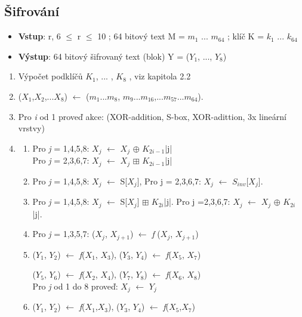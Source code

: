 \documentclass[12pt,a4paper]{article}
\begin{document}
{\subsection{Šifrování}}

\begin{itemize}  
\item \textbf{Vstup}: r, 6 $\leq$ r $\leq$ 10 ; 64 bitový text M = $m_{1}$ ... $m_{64}$ ; klíč K = $k_{1}$ ... $k_{64}$
\item \textbf{Výstup}: 64 bitový šifrovaný text (blok) Y = ($Y_{1}$, ..., $Y_{8}$) 
\end{itemize}

\begin{enumerate}
\item Výpočet podklíčů $K_{1}$, ... , $K_{8}$ , viz kapitola 2.2 
\item ($X_{1}$,$X_{2}$,...$X_{8}$) 
$\leftarrow$
($m_{1}$...$m_{8}$, $m_{9}$...$m_{16}$,...$m_{57}$...$m_{64}$).
\item Pro \emph{i} od 1 proveď akce: (XOR-addition, S-box, XOR-adittion, 3x lineární vrstvy)
\item

\begin{enumerate}
\item Pro \emph{j} = 1,4,5,8: $X_{j}$ $\leftarrow$ $X_{j}$ $\oplus$ $K_{2i-1}$|j|\\
Pro \emph{j} = 2,3,6,7: $X_{j}$ $\leftarrow$ $X_{j}$ $\boxplus$ $K_{2i-1}$|j|
\item Pro \emph{j} = 1,4,5,8: $X_{j}$ $\leftarrow$ S[$X_{j}$], Pro j = 2,3,6,7: $X_{j}$ $\leftarrow$ $S_{inv}$[$X_{j}$].

\item Pro \emph{j} = 1,4,5,8: $X_{j}$ $\leftarrow$ S[$X_{j}$] $\boxplus$ $K_{2i}$|j|. Pro j =2,3,6,7: $X_{j}$ $\leftarrow$ $X_{j}$ $\oplus$ $K_{2i}$|j|.

\item Pro \emph{j} = 1,3,5,7: ($X_{j}$, $X_{j+1}$) $\leftarrow$ \emph{f} ($X_{j}$, $X_{j+1}$)

\item ($Y_{1}$, $Y_{2}$) $\leftarrow$ \emph{f}($X_{1}$, $X_{3}$), ($Y_{3}$, $Y_{4}$) $\leftarrow$ \emph{f}($X_{5}$, $X_{7}$)

($Y_{5}$, $Y_{6}$) $\leftarrow$ \emph{f}($X_{2}$, $X_{4}$), ($Y_{7}$, $Y_{8}$) $\leftarrow$ \emph{f}($X_{6}$, $X_{8}$)
\\
Pro  \emph{j} od 1 do 8 proveď: $X_{j}$ $\leftarrow$ $Y_{j}$
\item ($Y_{1}$, $Y_{2}$) $\leftarrow$ \emph{f}($X_{1}$,$X_{3}$), ($Y_{3}$, $Y_{4}$) $\leftarrow$ \emph{f}($X_{5}$,$X_{7}$)


\end{enumerate}
\end{enumerate}
\end{document}
